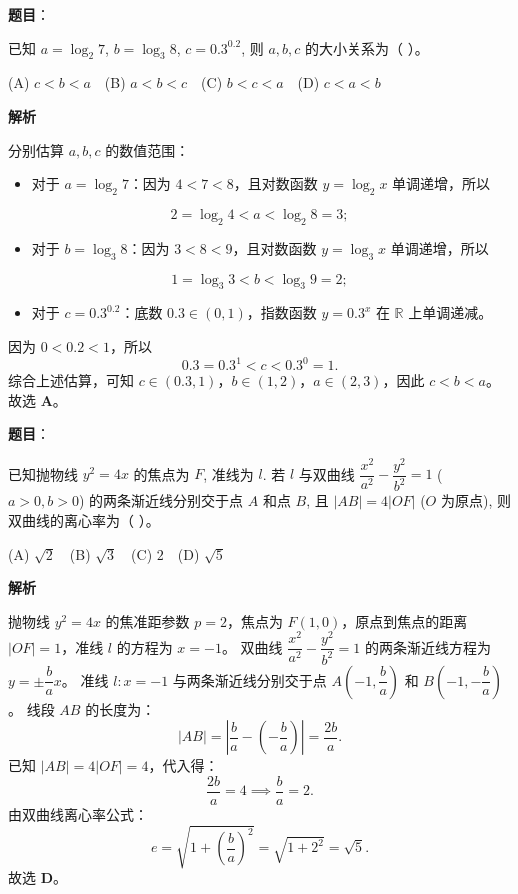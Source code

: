 \begin{answer}

\textbf{题目}：

已知 $a = \log_2 7$, $b = \log_3 8$, $c = 0.3^{0.2}$, 则 $a, b, c$ 的大小关系为（ ）。

(A) $c < b < a$　(B) $a < b < c$　(C) $b < c < a$　(D) $c < a < b$

\textbf{解析}

分别估算 $a, b, c$ 的数值范围：
\begin{itemize}
\item 对于 $a = \log_2 7$：因为 $4 < 7 < 8$，且对数函数 $y = \log_2 x$ 单调递增，所以
\end{itemize}
\nopagebreak[4]
\[2 = \log_2 4 < a < \log_2 8 = 3;\]
\begin{itemize}
\item 对于 $b = \log_3 8$：因为 $3 < 8 < 9$，且对数函数 $y = \log_3 x$ 单调递增，所以
\end{itemize}
\nopagebreak[4]
\[1 = \log_3 3 < b < \log_3 9 = 2;\]
\begin{itemize}
\item 对于 $c = 0.3^{0.2}$：底数 $0.3 \in (0, 1)$，指数函数 $y = 0.3^x$ 在 $\mathbb{R}$ 上单调递减。
\end{itemize}
  因为 $0 < 0.2 < 1$，所以
\nopagebreak[4]
\[0.3 = 0.3^1 < c < 0.3^0 = 1.\]
综合上述估算，可知 $c \in (0.3, 1)$，$b \in (1, 2)$，$a \in (2, 3)$，因此 $c < b < a$。
故选 \textbf{A}。


\end{answer}
\begin{answer}

\textbf{题目}：

已知抛物线 $y^2 = 4x$ 的焦点为 $F$, 准线为 $l$. 若 $l$ 与双曲线 $\dfrac{x^2}{a^2} - \dfrac{y^2}{b^2} = 1$ ($a > 0, b > 0$) 的两条渐近线分别交于点 $A$ 和点 $B$, 且 $|AB| = 4|OF|$ ($O$ 为原点), 则双曲线的离心率为（ ）。

(A) $\sqrt{2}$　(B) $\sqrt{3}$　(C) $2$　(D) $\sqrt{5}$

\textbf{解析}

抛物线 $y^2 = 4x$ 的焦准距参数 $p = 2$，焦点为 $F(1, 0)$，原点到焦点的距离 $|OF| = 1$，准线 $l$ 的方程为 $x = -1$。
双曲线 $\dfrac{x^2}{a^2} - \dfrac{y^2}{b^2} = 1$ 的两条渐近线方程为 $y = \pm \dfrac{b}{a} x$。
准线 $l: x = -1$ 与两条渐近线分别交于点 $A\left(-1, \dfrac{b}{a}\right)$ 和 $B\left(-1, -\dfrac{b}{a}\right)$。
线段 $AB$ 的长度为：
\nopagebreak[4]
\[|AB| = \left|\frac{b}{a} - \left(-\frac{b}{a}\right)\right| = \frac{2b}{a}.\]
已知 $|AB| = 4|OF| = 4$，代入得：
\nopagebreak[4]
\[\frac{2b}{a} = 4 \implies \frac{b}{a} = 2.\]
由双曲线离心率公式：
\nopagebreak[4]
\[e = \sqrt{1 + \left(\frac{b}{a}\right)^2} = \sqrt{1 + 2^2} = \sqrt{5}.\]
故选 \textbf{D}。


\end{answer}
